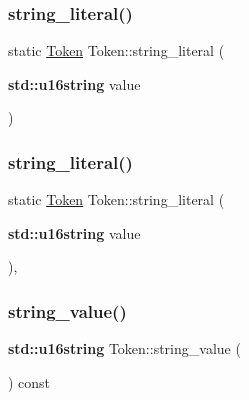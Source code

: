 \mbox{\label{class_token_a2fcf0ef9b36f5dec4ddc654aebd943ce}} 
\subsubsection{\texorpdfstring{string\+\_\+literal()}{string\_literal()}\hspace{0.1cm}{\footnotesize\ttfamily [1/2]}}
{\footnotesize\ttfamily static \hyperlink{class_token}{Token} Token\+::string\+\_\+literal (\begin{DoxyParamCaption}\item[{\textbf{ std\+::u16string}}]{value }\end{DoxyParamCaption})\hspace{0.3cm}{\ttfamily [static]}}

\mbox{\label{class_token_a2fcf0ef9b36f5dec4ddc654aebd943ce}} 
\subsubsection{\texorpdfstring{string\+\_\+literal()}{string\_literal()}\hspace{0.1cm}{\footnotesize\ttfamily [2/2]}}
{\footnotesize\ttfamily static \hyperlink{class_token}{Token} Token\+::string\+\_\+literal (\begin{DoxyParamCaption}\item[{\textbf{ std\+::u16string}}]{value }\end{DoxyParamCaption})\hspace{0.3cm}{\ttfamily [inline]}, {\ttfamily [static]}}

\mbox{\label{class_token_a33ae55bb14a681a6e5ab1e4abc36ca86}} 
\subsubsection{\texorpdfstring{string\+\_\+value()}{string\_value()}}
{\footnotesize\ttfamily \textbf{ std\+::u16string} Token\+::string\+\_\+value (\begin{DoxyParamCaption}{ }\end{DoxyParamCaption}) const\hspace{0.3cm}{\ttfamily [inline]}}

